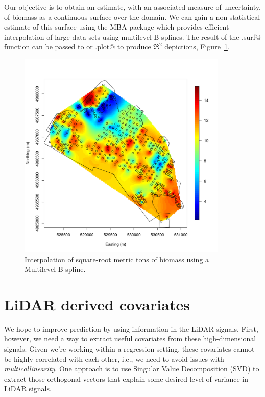 \documentclass{article}
\newcommand{\pkg}[1]{{\normalfont\fontseries{b}\selectfont #1}}
\begin{document}
Our objective is to obtain an estimate, with an associated measure of uncertainty, of biomass as a continuous surface over the domain. We can gain a non-statistical estimate of this surface using the \pkg{MBA} package which provides efficient interpolation of large data sets using multilevel B-splines. The result of the \verb@mba.surf@ function can be passed to \verb@image@ or \verb@image.plot@ to produce $\Re^2$ depictions, Figure~\ref{fig:MBASurf}.

\begin{Schunk}
\end{Schunk}

\begin{figure}
\begin{center}
\includegraphics[width=10cm]{figures/fig-MBASurf}
\end{center}
\caption{Interpolation of square-root metric tons of biomass using a Multilevel B-spline.}
\label{fig:MBASurf}
\end{figure}

\section{LiDAR derived covariates}
We hope to improve prediction by using information in the LiDAR signals. First, however, we need a way to extract useful covariates from these high-dimensional signals. Given we're working within a regression setting, these covariates cannot be highly correlated with each other, i.e., we need to avoid issues with \emph{multicollinearity}. One approach is to use Singular Value Decomposition (SVD) to extract those orthogonal vectors that explain some desired level of variance in LiDAR signals. 
\end{document}
